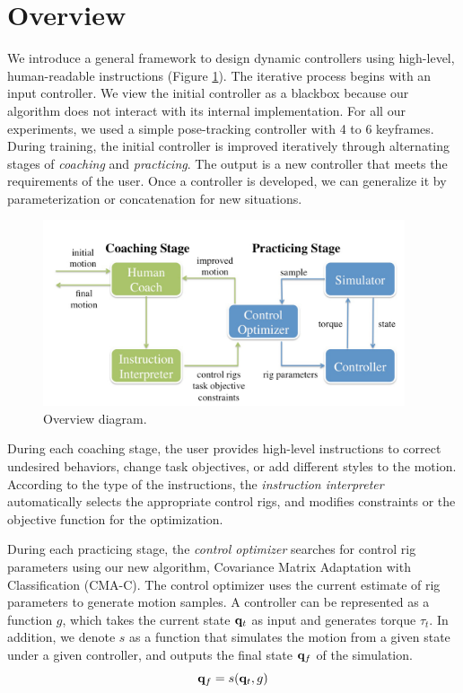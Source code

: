 \section{Overview}

We introduce a general framework to design dynamic controllers using
high-level, human-readable instructions (Figure
\ref{fig:parkour_overview}). The iterative process begins with an input
controller. We view the initial controller as a blackbox because our
algorithm does not interact with its internal implementation. For all
our experiments, we used a simple pose-tracking controller with 4 to 6
keyframes. During training, the initial controller is improved
iteratively through alternating stages of \textit{coaching} and
\textit{practicing}. The output is a new controller that meets the
requirements of the user. Once a controller is developed, we can
generalize it by parameterization or concatenation for new situations.

\begin{figure}[ht]
\center
  \includegraphics[width=4.2in]{images/diagram}
  \caption{
    Overview diagram. 
  }
  \label{fig:parkour_overview}
\end{figure}

During each coaching stage, the user provides high-level instructions
to correct undesired behaviors, change task objectives, or add
different styles to the motion. According to the type of the
instructions, the \textit{instruction interpreter} automatically selects
the appropriate control rigs, and modifies constraints or the
objective function for the optimization. 

During each practicing stage, the \textit{control optimizer} searches
for control rig parameters using our new algorithm, Covariance Matrix
Adaptation with Classification (CMA-C). The control optimizer uses the
current estimate of rig parameters to generate motion samples. A
controller can be represented as a function $g$, which takes the
current state $\mathbf{q}_t$ as input and generates torque $\tau_t$. In
addition, we denote $s$ as a function that simulates the motion from a
given state under a given controller, and outputs the final state
$\mathbf{q}_f$ of the simulation.
\begin{equation}
  \mathbf{q}_f = s(\mathbf{q}_t, g)
\end{equation}

